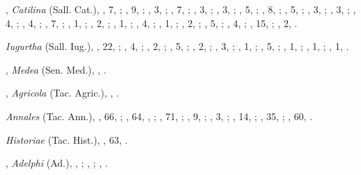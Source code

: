 \begin{autindex}
\indexspace

,
  \subitem \emph{Catilina} (Sall. Cat.),
    ,  7, ;
    ,  9, ;
    ,  3, ;
    ,  7, ;
    ,  3, ;
    ,  3, ;
    ,  5, ;
    ,  8, ;
    ,  5, ;
    ,  3, ;
    ,  3, ;
    ,  4, ;
    ,  4, ;
    ,  7, ;
    ,  1, ;
    ,  2, ;
    ,  1, ;
    ,  4, ;
    ,  1, ;
    ,  2, ;
    ,  5, ;
    ,  4, ;
    , 15, ;
    ,  2, .

  \subitem \emph{Iugurtha} (Sall. Iug.),
    , 22, ;
    ,  4, ;
    ,  2, ;
    ,  5, ;
    ,  2, ;
    ,  3, ;
    ,  1, ;
    ,  5, ;
    ,  1, ;
    ,  1, ;
    ,  1, .

\indexspace

,
  \subitem \emph{Medea} (Sen. Med.),
    , .

\indexspace

,
  \subitem \emph{Agricola} (Tac. Agric.),
    , .

  \subitem \emph{Annales} (Tac. Ann.),
    , 66, ;
    , 64, , ;
    , 71, ;
    ,  9, ;
    ,  3, ;
    , 14, ;
    , 35, ;
    , 60, .

  \subitem \emph{Historiae} (Tac. Hist.),
    , 63, .

\indexspace

,
  \subitem \emph{Adelphī} (Ad.),
    , ;
    , ;
    , .


\end{autindex}

